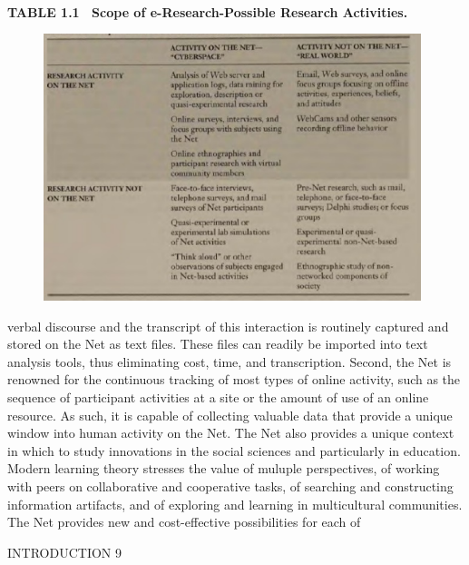 ‎\documentclass[a4paper,12pt]{book}‎
\begin{document}
\vspace{5mm}
\hspace{-2.5cm}
\textbf{TABLE 1.1   \  Scope of e-Research-Possible Research Activities.}
\vspace{1mm}
\begin{figure}[tbh]
\begin{center}
\includegraphics[width=11cm]{jadval.eps}
\label{fig_name}
\end{center}
\end{figure}
\hspace{-2.5cm}
\vspace{2mm}
verbal discourse and the transcript of this interaction is routinely captured and stored on the Net as text files. These files can readily be imported into text analysis tools, thus eliminating cost, time, and transcription. Second, the Net is renowned for the continuous tracking of most types of online activity, such as the sequence of participant activities at a site or the amount of use of an online resource. As such, it is capable of collecting valuable data that provide a unique window into human activity on the Net.
The Net also provides a unique 
context in which to study innovations in the social sciences and particularly in education. Modern learning theory stresses the value of muluple perspectives, of working with peers on collaborative and cooperative tasks, of searching and constructing information artifacts, and of exploring and learning in multicultural communities. The Net provides new and cost-effective possibilities for each of 
\vspace{5mm}
\begin{flushright}
INTRODUCTION
\hspace{6mm}
9
\end{flushright} 
\vspace{2mm}
\end{document}
